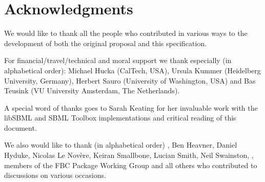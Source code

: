 
\section{Acknowledgments}

We would like to thank all the people who contributed in various ways to the development of both the original proposal and this specification.

For financial/travel/technical and moral support we thank especially (in alphabetical order): Michael Hucka (CalTech, USA), Ursula Kummer (Heidelberg University, Germany), Herbert Sauro (University of Washington, USA) and Bas Teusink (VU University Amsterdam, The Netherlands).

A special word of thanks goes to Sarah Keating for her invaluable work with the \textsf{libSBML} and \textsf{SBML Toolbox} implementations and critical reading of this document.

We also would like to thank (in alphabetical order) , Ben Heavner, Daniel Hyduke, Nicolas Le Nov\`{e}re, Keiran Smallbone, Lucian Smith, Neil Swainston, , members of the \textsf{FBC Package Working Group} and all others who contributed to discussions on various occasions.



